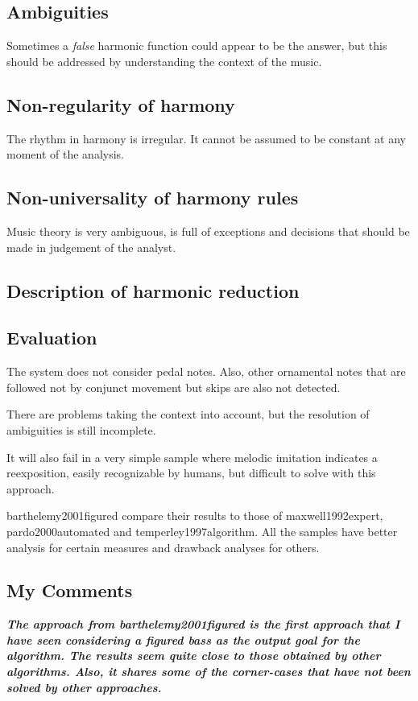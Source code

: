 	\subsection{Ambiguities}
			Sometimes a \emph{false} harmonic function could appear to be the answer, but this should be addressed by understanding the context of the music.
	\subsection{Non-regularity of harmony}
			The rhythm in harmony is irregular. It cannot be assumed to be constant at any moment of the analysis.
	\subsection{Non-universality of harmony rules}
			Music theory is very ambiguous, is full of exceptions and decisions that should be made in judgement of the analyst.
	\subsection{Description of harmonic reduction}
	\subsection{Evaluation}
		The system does not consider pedal notes. Also, other ornamental notes that are followed not by conjunct movement but skips are also not detected.

		There are problems taking the context into account, but the resolution of ambiguities is still incomplete.

		It will also fail in a very simple sample where melodic imitation indicates a reexposition, easily recognizable by humans, but difficult to solve with this approach.

		barthelemy2001figured compare their results to those of maxwell1992expert, pardo2000automated and temperley1997algorithm. All the samples have better analysis for certain measures and drawback analyses for others.
	\subsection{My Comments}
		\emph{\textbf{
			The approach from barthelemy2001figured is the first approach that I have seen considering a figured bass as the output goal for the algorithm. The results seem quite close to those obtained by other algorithms. Also, it shares some of the corner-cases that have not been solved by other approaches.
		}}

